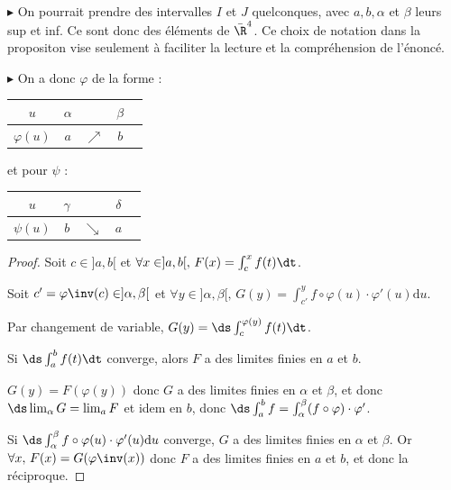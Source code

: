 \begin{remarque}
    $\blacktriangleright$ On pourrait prendre des intervalles $I$ et $J$ quelconques, 
    avec $a, b, \alpha$ et $\beta$ leurs sup et inf. Ce sont donc des éléments de $\bar \R^4$.
    Ce choix de notation dans la propositon vise seulement à faciliter la lecture et la compréhension de l'énoncé.

    \avspace $\blacktriangleright$ On a donc $\varphi$ de la forme :  
    \begin{center}
        \begin{tabular}{c|c c c c}
            $u$ & $\alpha$ &  & $\beta$ \\
            \hline
            $\varphi(u)$ & $a$ & $\nearrow$ &$b$ \\
        \end{tabular}
    \end{center}

    et pour $\psi$ :
    \begin{center}
        \begin{tabular}{c|c c c c}
            $u$ & $\gamma$ &  & $\delta$ \\
            \hline
            $\psi(u)$ & $b$ & $\searrow$ &$a$ \\
        \end{tabular}
    \end{center}
\end{remarque}


\begin{proof}
    Soit $c \in ]a, b[$ et $\forall x \in ]a, b[, \, F(x) = \int_c^x f(t) \dt$.

    Soit $c' = \varphi \inv (c) \in ]\alpha, \beta[$ et 
    $\forall y \in ] \alpha, \beta[, \, G(y) = \int_{c'}^y f \circ \varphi(u) \cdot \varphi'(u) \mathrm d u$.

    Par changement de variable, $G(y) = \ds \int_c^{\varphi(y)} f(t) \dt$. 

    Si $\ds \int_{a }^{b } f(t) \dt$ converge, alors $F$ a des limites finies en $a$ et $b$.

    $G(y) = F(\varphi(y))$ donc $G$ a des limites finies en $\alpha$ et $\beta$, et donc 
    $\ds \lim_\alpha G = \lim_a F$ et idem en $b$, donc 
    $\ds \int_{a }^{b } f = \int_\alpha^\beta (f \circ \varphi) \cdot \varphi'$.

    Si $\ds \int_{\alpha }^{\beta } f \circ \varphi(u) \cdot \varphi'(u) \mathrm d u$ converge,
    $G$ a des limites finies en $\alpha$ et $\beta$. Or $\forall x, \, F(x) = G(\varphi \inv (x))$ donc $F$ a des limites finies en $a$ et $b$, et
    donc la réciproque. 
\end{proof}


